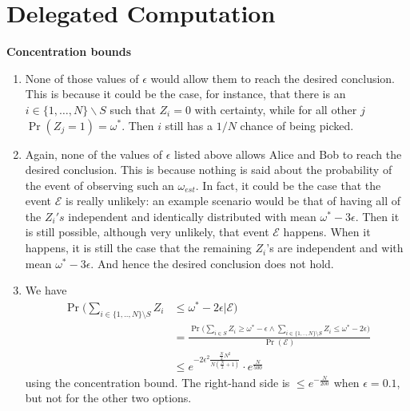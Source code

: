 
\chapter{Delegated Computation}

\begin{exercises}


\item {\bf Concentration bounds}
\begin{enumerate}
\item None of those values of $\epsilon$ would allow them to reach the desired conclusion. This is because it could be the case, for instance, that there is an $i\in\{1,\ldots,N\}\backslash S$ such that $Z_i = 0$ with certainty, while for all other $j$ $\Pr(Z_j=1) = \omega^*$. Then $i$ still has a $1/N$ chance of being picked.

\item Again, none of the values of $\epsilon$ listed above allows Alice and Bob to reach the desired conclusion. This is because nothing is said about the probability of the event of observing such an $\omega_{est}$. In fact, it could be the case that the event $\mathcal{E}$ is really unlikely: an example scenario would be that of having all of the $Z_i's$ independent and identically distributed with mean $\omega^*-3\epsilon$. Then it is still possible, although very unlikely, that event $\mathcal{E}$ happens. When it happens, it is still the case that the remaining $Z_i$'s are independent and with mean $\omega^*-3\epsilon$. And hence the desired conclusion does not hold.
\item We have
\begin{align*}
\Pr\Big(\sum_{i \in \{1,..,N\}\setminus S} Z_i &\leq \omega^*-2\epsilon \Big| \mathcal{E}\Big)\\
&= \frac{\Pr\big(\sum_{i \in S} Z_i \geq \omega^*-\epsilon \land \sum_{i \in \{1,..,N\}\setminus S} Z_i \leq \omega^*-2\epsilon\big)}{\Pr(\mathcal{E})} \\
&\leq e^{-2\epsilon^2 \frac{\frac{N}{2} N^2}{N (\frac{N}{2}+1)}} \cdot e^{\frac{N}{500}}
\end{align*}
using the concentration bound. 
The right-hand side is $\leq e^{-\frac{N}{200}}$ when $\epsilon = 0.1$, but not for the other two options.
\end{enumerate}
\end{exercises}